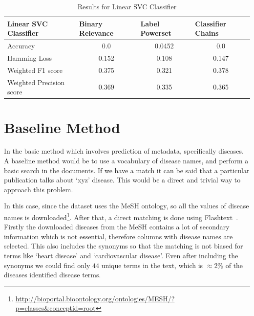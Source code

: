 \begin{table}[!htb]
    \centering
    \begin{tabular}{|l|c|c|c|}
\hline
Linear SVC Classifier    & \multicolumn{1}{l|}{Binary Relevance} & \multicolumn{1}{l|}{Label Powerset} & \multicolumn{1}{l|}{Classifier Chains} \\ \hline
Accuracy                 & 0.0                                   & 0.0452                              & 0.0                                    \\ \hline
Hamming Loss             & 0.152                                 & 0.108                               & 0.147                                  \\ \hline
Weighted F1 score        & 0.375                                 & 0.321                               & 0.378                                  \\ \hline
Weighted Precision score & 0.369                                 & 0.335                               & 0.365                                  \\ \hline
\end{tabular}
    \caption{Results for Linear SVC Classifier}
    \label{tab:linearsvc}
\end{table}


\section{Baseline Method}
In the basic method which involves prediction of metadata, specifically diseases. A baseline method would be to use a vocabulary of disease names, and perform a basic search in the documents. If we have a match it can be said that a particular publication talks about `xyz' disease. This would be a direct and trivial way to approach this problem. 

In this case, since the dataset uses the MeSH ontology, so all the values of disease names is downloaded\footnote{\url{http://bioportal.bioontology.org/ontologies/MESH/?p=classes&conceptid=root}}. After that, a direct matching is done using Flashtext~\cite{2017arXiv171100046S}. Firstly the downloaded diseases from the MeSH contains a lot of secondary information which is not essential, therefore columns with disease names are selected. This also includes the synonyms so that the matching is not biased for terms like `heart disease' and `cardiovascular disease'. Even after including the synonyms we could find only $44$ unique terms in the text, which is $\approx$2\% of the diseases identified disease terms. 

